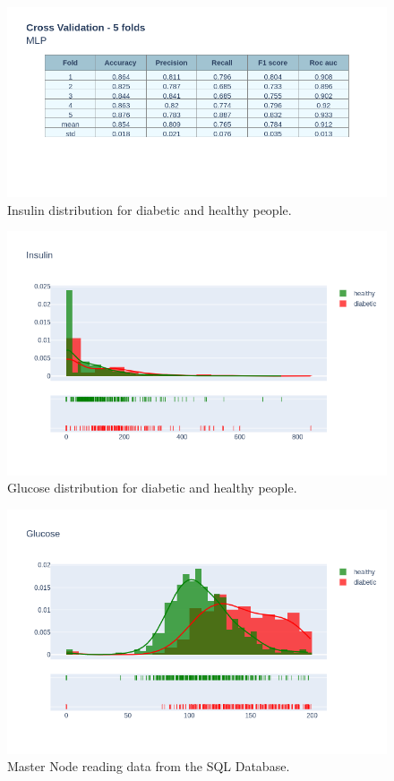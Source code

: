 \documentclass[12pt]{article}
\begin{document}
\begin{figure}[ht]
\centering
\includegraphics[width=1\textwidth]{newplot(44).png}
\caption{Insulin distribution for diabetic and healthy people.}
\end{figure}

\begin{figure}[ht]
\centering
\includegraphics[width=1\textwidth]{newplot(4).png}
\caption{Glucose distribution for diabetic and healthy people.}
\end{figure}

\begin{figure}[ht]
\centering
\includegraphics[width=1\textwidth]{newplot(5).png}
\caption{Master Node reading data from the SQL Database.}
\end{figure}
\end{document}
